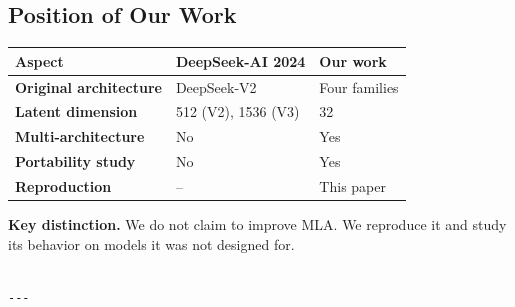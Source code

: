\subsection{Position of Our Work}

\begin{table}[H]
\centering
\small
\begin{tabular}{lll}
\toprule
\textbf{Aspect} & \textbf{DeepSeek-AI 2024} & \textbf{Our work} \\
\midrule
\textbf{Original architecture} & DeepSeek-V2 & Four families \\
\textbf{Latent dimension} & 512 (V2), 1536 (V3) & 32 \\
\textbf{Multi-architecture} & No & Yes \\
\textbf{Portability study} & No & Yes \\
\textbf{Reproduction} & -- & This paper \\
\bottomrule
\end{tabular}
\end{table}

\textbf{Key distinction.} We do not claim to improve MLA. We reproduce it and 
study its behavior on models it was not designed for.
\begin{lstlisting}

---
\end{lstlisting}